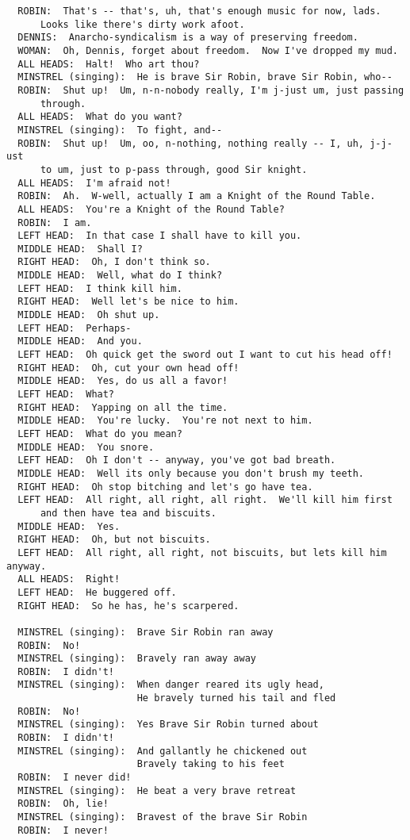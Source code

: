 \documentclass{article}
\begin{document}
\begin{verbatim}
  ROBIN:  That's -- that's, uh, that's enough music for now, lads.
      Looks like there's dirty work afoot.
  DENNIS:  Anarcho-syndicalism is a way of preserving freedom.
  WOMAN:  Oh, Dennis, forget about freedom.  Now I've dropped my mud.
  ALL HEADS:  Halt!  Who art thou?
  MINSTREL (singing):  He is brave Sir Robin, brave Sir Robin, who--
  ROBIN:  Shut up!  Um, n-n-nobody really, I'm j-just um, just passing
      through.
  ALL HEADS:  What do you want?
  MINSTREL (singing):  To fight, and--
  ROBIN:  Shut up!  Um, oo, n-nothing, nothing really -- I, uh, j-j-ust
      to um, just to p-pass through, good Sir knight.
  ALL HEADS:  I'm afraid not!
  ROBIN:  Ah.  W-well, actually I am a Knight of the Round Table.
  ALL HEADS:  You're a Knight of the Round Table?
  ROBIN:  I am.
  LEFT HEAD:  In that case I shall have to kill you.
  MIDDLE HEAD:  Shall I?
  RIGHT HEAD:  Oh, I don't think so.
  MIDDLE HEAD:  Well, what do I think?
  LEFT HEAD:  I think kill him.
  RIGHT HEAD:  Well let's be nice to him.
  MIDDLE HEAD:  Oh shut up.
  LEFT HEAD:  Perhaps-
  MIDDLE HEAD:  And you.
  LEFT HEAD:  Oh quick get the sword out I want to cut his head off!
  RIGHT HEAD:  Oh, cut your own head off!
  MIDDLE HEAD:  Yes, do us all a favor!
  LEFT HEAD:  What?
  RIGHT HEAD:  Yapping on all the time.
  MIDDLE HEAD:  You're lucky.  You're not next to him.
  LEFT HEAD:  What do you mean?
  MIDDLE HEAD:  You snore.
  LEFT HEAD:  Oh I don't -- anyway, you've got bad breath.
  MIDDLE HEAD:  Well its only because you don't brush my teeth.
  RIGHT HEAD:  Oh stop bitching and let's go have tea.
  LEFT HEAD:  All right, all right, all right.  We'll kill him first
      and then have tea and biscuits.
  MIDDLE HEAD:  Yes.
  RIGHT HEAD:  Oh, but not biscuits.
  LEFT HEAD:  All right, all right, not biscuits, but lets kill him anyway.
  ALL HEADS:  Right!
  LEFT HEAD:  He buggered off.
  RIGHT HEAD:  So he has, he's scarpered.

  MINSTREL (singing):  Brave Sir Robin ran away
  ROBIN:  No!
  MINSTREL (singing):  Bravely ran away away
  ROBIN:  I didn't!
  MINSTREL (singing):  When danger reared its ugly head,
                       He bravely turned his tail and fled
  ROBIN:  No!
  MINSTREL (singing):  Yes Brave Sir Robin turned about
  ROBIN:  I didn't!
  MINSTREL (singing):  And gallantly he chickened out
                       Bravely taking to his feet
  ROBIN:  I never did!
  MINSTREL (singing):  He beat a very brave retreat
  ROBIN:  Oh, lie!
  MINSTREL (singing):  Bravest of the brave Sir Robin
  ROBIN:  I never!


\end{verbatim}
\end{document}
